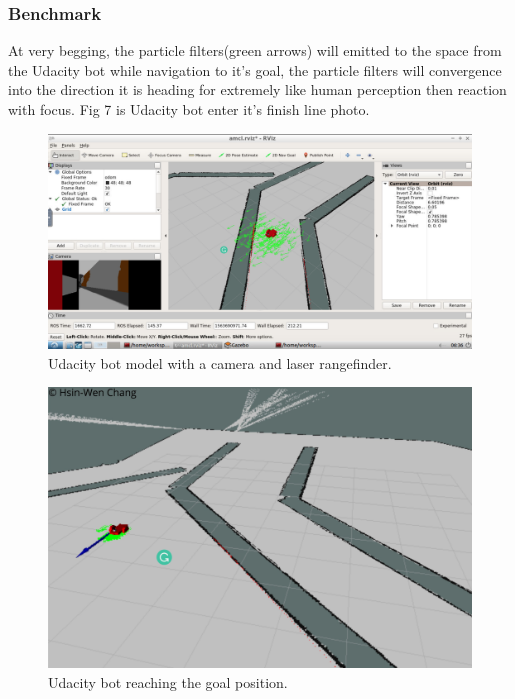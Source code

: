 \documentclass[10pt,journal,compsoc]{IEEEtran}
\begin{document}
\subsubsection{Benchmark}
At very begging, the particle filters(green arrows) will emitted to the space from the Udacity bot while navigation to it's goal, the particle filters will convergence into the direction it is heading for extremely like human perception then reaction with focus. Fig 7 
is Udacity bot enter it's finish line photo.
\begin{figure}[thpb]
      \centering
      \includegraphics[width=\linewidth]{acml.png}
      \caption{Udacity bot model with a camera and laser rangefinder.}
      \label{fig:robot1}
\end{figure}
\begin{figure}[thpb]
      \centering
      \includegraphics[width=\linewidth]{f2.png}
      \caption{Udacity bot reaching the goal position.}
      \label{fig:robot1}
\end{figure}
\end{document}
